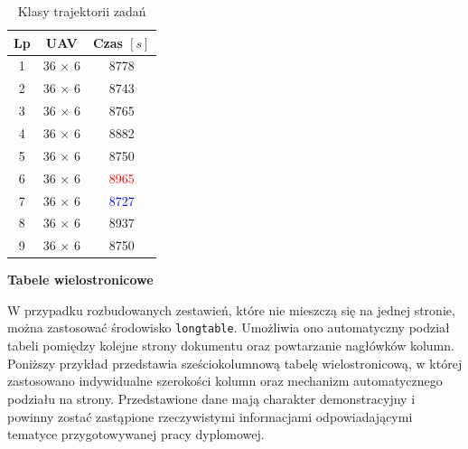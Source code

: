 \begin{table}[H]
    \caption{Klasy trajektorii zadań}
    \label{tab2}
    \centering
    \begin{tabular}{ccc}
        \toprule
        \textbf{Lp} & \textbf{UAV}  & \textbf{Czas $\left [ s \right ]$} \\ \toprule
        1           & 36 $\times$ 6 & 8778                               \\
        2           & 36 $\times$ 6 & 8743                               \\
        3           & 36 $\times$ 6 & 8765                               \\
        4           & 36 $\times$ 6 & 8882                               \\
        5           & 36 $\times$ 6 & 8750                               \\
        6           & 36 $\times$ 6 & \textcolor{red}{8965}              \\
        7           & 36 $\times$ 6 & \textcolor{blue}{8727}             \\
        8           & 36 $\times$ 6 & 8937                               \\
        9           & 36 $\times$ 6 & 8750                               \\ \bottomrule
    \end{tabular}
\end{table}

\noindent \textbf{Tabele wielostronicowe} 

W przypadku rozbudowanych zestawień, które nie mieszczą się na jednej stronie, można zastosować środowisko \texttt{longtable}. Umożliwia ono automatyczny podział tabeli pomiędzy kolejne strony dokumentu oraz powtarzanie nagłówków kolumn. Poniższy przykład przedstawia sześciokolumnową tabelę wielostronicową, w której zastosowano indywidualne szerokości kolumn oraz mechanizm automatycznego podziału na strony. Przedstawione dane mają charakter demonstracyjny i powinny zostać zastąpione rzeczywistymi informacjami odpowiadającymi tematyce przygotowywanej pracy dyplomowej.

\begingroup

\footnotesize
\setlength{\tabcolsep}{4pt}%
\setlength{\LTcapwidth}{\linewidth}
\renewcommand{\arraystretch}{1.12}%

